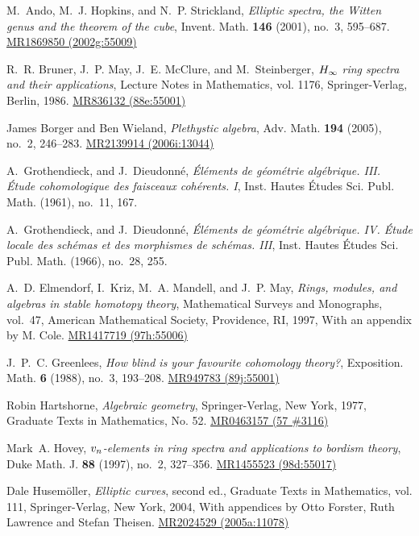 \documentclass{gtpart}
\theoremstyle{definition}
\theoremstyle{remark}
\begin{document}
\newcommand{\MRn}[2]{\href{http://www.ams.org/mathscinet-getitem?mr=#1}{MR#1 #2}}
\begin{thebibliography}

M.~Ando, M.~J. Hopkins, and N.~P. Strickland, \emph{Elliptic spectra, the
  {W}itten genus and the theorem of the cube}, Invent. Math. \textbf{146}
  (2001), no.~3, 595--687. \MRn{1869850}{(2002g:55009)}

R.~R. Bruner, J.~P. May, J.~E. McClure, and M.~Steinberger, \emph{{$H\sb \infty
  $} ring spectra and their applications}, Lecture Notes in Mathematics, vol.
  1176, Springer-Verlag, Berlin, 1986. \MRn{836132}{(88e:55001)}

James Borger and Ben Wieland, \emph{Plethystic algebra}, Adv. Math.
  \textbf{194} (2005), no.~2, 246--283. \MRn{2139914}{(2006i:13044)}

A.~Grothendieck, and J.~Dieudonn\'e, \emph{\'{E}l\'ements de g\'eom\'etrie alg\'ebrique. {III}.
  \'{E}tude cohomologique des faisceaux coh\'erents. {I}}, Inst. Hautes
  \'Etudes Sci. Publ. Math. (1961), no.~11, 167.

A.~Grothendieck, and J.~Dieudonn\'e, \emph{\'{E}l\'ements de g\'eom\'etrie alg\'ebrique. {IV}. \'{E}tude
  locale des sch\'emas et des morphismes de sch\'emas. {III}}, Inst. Hautes
  \'Etudes Sci. Publ. Math. (1966), no.~28, 255.

A.~D. Elmendorf, I.~Kriz, M.~A. Mandell, and J.~P. May, \emph{Rings, modules,
  and algebras in stable homotopy theory}, Mathematical Surveys and Monographs,
  vol.~47, American Mathematical Society, Providence, RI, 1997, With an
  appendix by M. Cole. \MRn{1417719}{(97h:55006)}

J.~P.~C. Greenlees, \emph{How blind is your favourite cohomology theory?},
  Exposition. Math. \textbf{6} (1988), no.~3, 193--208. \MRn{949783}{(89j:55001)}

Robin Hartshorne, \emph{Algebraic geometry}, Springer-Verlag, New York, 1977,
  Graduate Texts in Mathematics, No. 52. \MRn{0463157}{(57 \#3116)}

Mark~A. Hovey, \emph{{$v\sb n$}-elements in ring spectra and applications to
  bordism theory}, Duke Math. J. \textbf{88} (1997), no.~2, 327--356.
  \MRn{1455523}{(98d:55017)}

Dale Husem{\"o}ller, \emph{Elliptic curves}, second ed., Graduate Texts in
  Mathematics, vol. 111, Springer-Verlag, New York, 2004, With appendices by
  Otto Forster, Ruth Lawrence and Stefan Theisen. \MRn{2024529}{(2005a:11078)}


\end{thebibliography}
\end{document}
